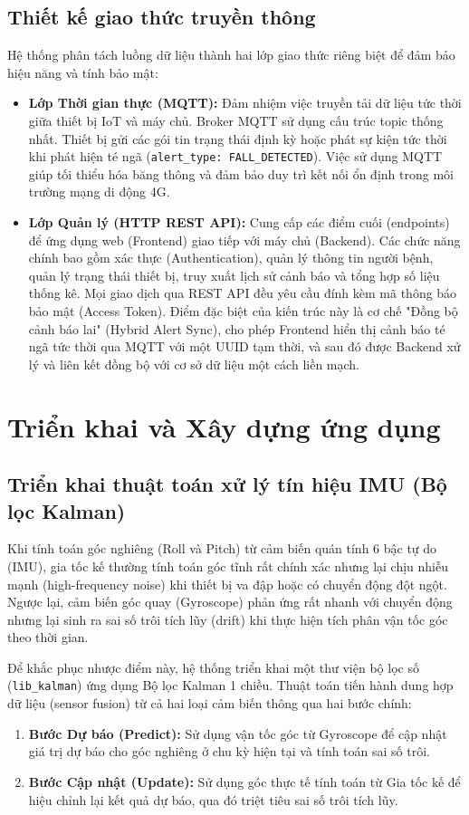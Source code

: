 \documentclass[../DoAn.tex]{subfiles}
\begin{document}
\subsection{Thiết kế giao thức truyền thông}
Hệ thống phân tách luồng dữ liệu thành hai lớp giao thức riêng biệt để đảm bảo hiệu năng và tính bảo mật:
\begin{itemize}
    \item \textbf{Lớp Thời gian thực (MQTT):} Đảm nhiệm việc truyền tải dữ liệu tức thời giữa thiết bị IoT và máy chủ. Broker MQTT sử dụng cấu trúc topic thống nhất. Thiết bị gửi các gói tin trạng thái định kỳ hoặc phát sự kiện tức thời khi phát hiện té ngã (\texttt{alert\_type: FALL\_DETECTED}). Việc sử dụng MQTT giúp tối thiểu hóa băng thông và đảm bảo duy trì kết nối ổn định trong môi trường mạng di động 4G.
    \item \textbf{Lớp Quản lý (HTTP REST API):} Cung cấp các điểm cuối (endpoints) để ứng dụng web (Frontend) giao tiếp với máy chủ (Backend). Các chức năng chính bao gồm xác thực (Authentication), quản lý thông tin người bệnh, quản lý trạng thái thiết bị, truy xuất lịch sử cảnh báo và tổng hợp số liệu thống kê. Mọi giao dịch qua REST API đều yêu cầu đính kèm mã thông báo bảo mật (Access Token). Điểm đặc biệt của kiến trúc này là cơ chế "Đồng bộ cảnh báo lai" (Hybrid Alert Sync), cho phép Frontend hiển thị cảnh báo té ngã tức thời qua MQTT với một UUID tạm thời, và sau đó được Backend xử lý và liên kết đồng bộ với cơ sở dữ liệu một cách liền mạch.
\end{itemize}

\section{Triển khai và Xây dựng ứng dụng}

\subsection{Triển khai thuật toán xử lý tín hiệu IMU (Bộ lọc Kalman)}
Khi tính toán góc nghiêng (Roll và Pitch) từ cảm biến quán tính 6 bậc tự do (IMU), gia tốc kế thường tính toán góc tĩnh rất chính xác nhưng lại chịu nhiễu mạnh (high-frequency noise) khi thiết bị va đập hoặc có chuyển động đột ngột. Ngược lại, cảm biến góc quay (Gyroscope) phản ứng rất nhanh với chuyển động nhưng lại sinh ra sai số trôi tích lũy (drift) khi thực hiện tích phân vận tốc góc theo thời gian.

Để khắc phục nhược điểm này, hệ thống triển khai một thư viện bộ lọc số (\texttt{lib\_kalman}) ứng dụng Bộ lọc Kalman 1 chiều. Thuật toán tiến hành dung hợp dữ liệu (sensor fusion) từ cả hai loại cảm biến thông qua hai bước chính:
\begin{enumerate}
    \item \textbf{Bước Dự báo (Predict):} Sử dụng vận tốc góc từ Gyroscope để cập nhật giá trị dự báo cho góc nghiêng ở chu kỳ hiện tại và tính toán sai số trôi.
    \item \textbf{Bước Cập nhật (Update):} Sử dụng góc thực tế tính toán từ Gia tốc kế để hiệu chỉnh lại kết quả dự báo, qua đó triệt tiêu sai số trôi tích lũy.
\end{enumerate}
\end{document}
